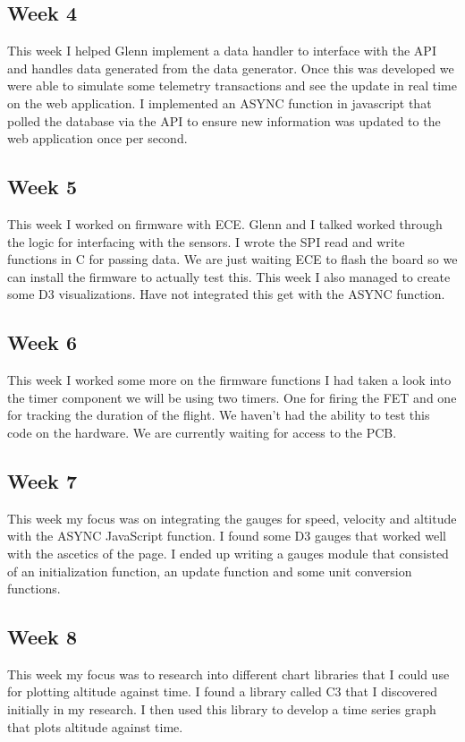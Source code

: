 \documentclass[onecolumn, draftclsnofoot,10pt, compsoc]{IEEEtran}
\begin{document}
\subsection{Week 4}
This week I helped Glenn implement a data handler to interface with the API and handles data generated from the data generator. Once this was developed we were able to simulate some telemetry transactions and see the update in real time on the web application. I implemented an ASYNC function in javascript that polled the database via the API to ensure new information was updated to the web application once per second.  
\subsection{Week 5}
This week I worked on firmware with ECE. Glenn and I talked worked through the logic for interfacing with the sensors. I wrote the SPI read and write functions in C for passing data. We are just waiting ECE to flash the board so we can install the firmware to actually test this. This week I also managed to create some D3 visualizations. Have not integrated this get with the ASYNC function. 
\subsection{Week 6}
This week I worked some more on the firmware functions I had taken a look into the timer component we will be using two timers. One for firing the FET and one for tracking the duration of the flight. We haven't had the ability to test this code on the hardware. We are currently waiting for access to the PCB.
\subsection{Week 7}
This week my focus was on integrating the gauges for speed, velocity and altitude with the ASYNC JavaScript function. I found some D3 gauges that worked well with the ascetics of the page. I ended up writing a gauges module that consisted of an initialization function, an update function and some unit conversion functions.
\subsection{Week 8}
This week my focus was to research into different chart libraries that I could use for plotting altitude against time. I found a library called C3 that I discovered initially in my research. I then used this library to develop a time series graph that plots altitude against time.
\end{document}
